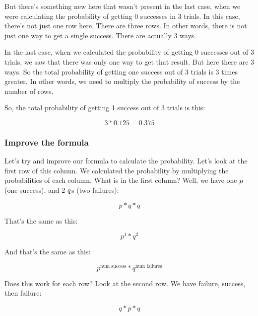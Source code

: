 \documentclass[../../../main.tex]{subfiles}
\begin{document}
\noindent
But there's something new here that wasn't present in the last case, when we were calculating the probability of getting 0 successes in 3 trials. In this case, there's not just one row here. There are three rows. In other words, there is not just one way to get a single success. There are actually 3 ways. 

In the last case, when we calculated the probability of getting 0 successes out of 3 trials, we saw that there was only one way to get that result. But here there are 3 ways. So the total probability of getting one success out of 3 trials is 3 times greater. In other words, we need to multiply the probability of success by the number of rows.

So, the total probability of getting 1 success out of 3 trials is this:

\begin{equation*}
    3 * 0.125 = 0.375
\end{equation*}


\subsubsection{Improve the formula}

Let's try and improve our formula to calculate the probability. Let's look at the first row of this column. We calculated the probability by multiplying the probabilities of each column. What is in the first column? Well, we have one $\success/$ (one success), and 2 $\failure/$s (two failures):

\begin{equation*}
    p * q * q
\end{equation*}

That's the same as this:

\begin{equation*}
   p^{1} * q^{2}
\end{equation*}

And that's the same as this:

\begin{equation*}
   p^{\text{num success}} * q^{\text{num failures}}
\end{equation*}

Does this work for each row? Look at the second row. We have failure, success, then failure:

\begin{equation*}
   q * p * q
\end{equation*}
\end{document}
